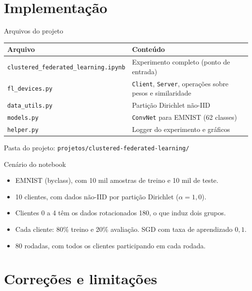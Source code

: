 \documentclass[aspectratio=169]{beamer}
\begin{document}
\section{Implementação}

\begin{frame}{Arquivos do projeto}
  \small
  \begin{tabular}{@{}ll@{}}
    \toprule
    Arquivo & Conteúdo \\
    \midrule
    \texttt{clustered\_federated\_learning.ipynb} & Experimento completo (ponto de entrada) \\
    \texttt{fl\_devices.py} & \texttt{Client}, \texttt{Server}, operações sobre pesos e similaridade \\
    \texttt{data\_utils.py} & Partição Dirichlet não-IID \\
    \texttt{models.py} & \texttt{ConvNet} para EMNIST (62 classes) \\
    \texttt{helper.py} & Logger do experimento e gráficos \\
    \bottomrule
  \end{tabular}
  \vspace{0.6em}

  \footnotesize Pasta do projeto: \texttt{projetos/clustered-federated-learning/}
\end{frame}

\begin{frame}{Cenário do notebook}
  \begin{itemize}
    \item EMNIST (byclass), com 10 mil amostras de treino e 10 mil de teste.
    \item 10 clientes, com dados não-IID por partição Dirichlet ($\alpha = 1{,}0$).
    \item Clientes 0 a 4 têm os dados rotacionados 180\textdegree{}, o que induz dois grupos.
    \item Cada cliente: 80\% treino e 20\% avaliação. SGD com taxa de aprendizado $0{,}1$.
    \item 80 rodadas, com todos os clientes participando em cada rodada.
  \end{itemize}
\end{frame}

\section{Correções e limitações}
\end{document}
